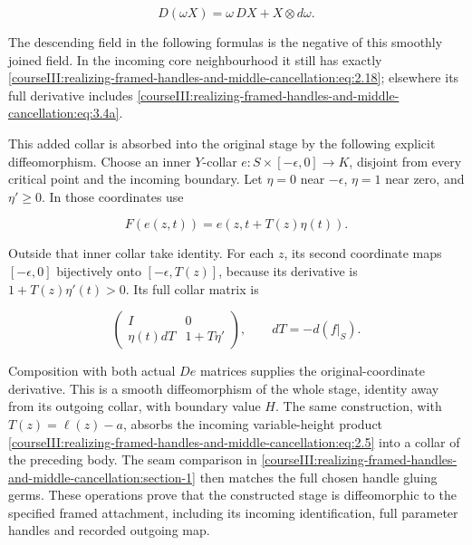 \begin{equation}
D(\omega X)=\omega\,DX+X\otimes d\omega.
 \label{courseIII:realizing-framed-handles-and-middle-cancellation:eq:3.4a}
\end{equation}

The descending field in the following formulas is the negative of this smoothly joined field. In the incoming core neighbourhood it still has exactly \eqref{courseIII:realizing-framed-handles-and-middle-cancellation:eq:2.18}; elsewhere its full derivative includes \eqref{courseIII:realizing-framed-handles-and-middle-cancellation:eq:3.4a}.

This added collar is absorbed into the original stage by the following explicit diffeomorphism. Choose an inner \(Y\)-collar \(e:S\times[-\epsilon,0]\to K\), disjoint from every critical point and the incoming boundary. Let \(\eta=0\) near \(-\epsilon\), \(\eta=1\) near zero, and \(\eta'\geq0\). In those coordinates use

\begin{equation}
F(e(z,t))=e(z,t+T(z)\eta(t)).
 \label{courseIII:realizing-framed-handles-and-middle-cancellation:eq:3.5}
\end{equation}

Outside that inner collar take identity. For each \(z\), its second coordinate maps \([-\epsilon,0]\) bijectively onto \([-\epsilon,T(z)]\), because its derivative is \(1+T(z)\eta'(t)>0\). Its full collar matrix is

\begin{equation}
\begin{pmatrix}
 I&0\\
 \eta(t)dT&1+T\eta'
 \end{pmatrix},
 \qquad dT=-d(f|_S).
 \label{courseIII:realizing-framed-handles-and-middle-cancellation:eq:3.6}
\end{equation}

Composition with both actual \(De\) matrices supplies the original-coordinate derivative. This is a smooth diffeomorphism of the whole stage, identity away from its outgoing collar, with boundary value \(H\). The same construction, with \(T(z)=\ell(z)-a\), absorbs the incoming variable-height product \eqref{courseIII:realizing-framed-handles-and-middle-cancellation:eq:2.5} into a collar of the preceding body. The seam comparison in \cref{courseIII:realizing-framed-handles-and-middle-cancellation:section-1} then matches the full chosen handle gluing germs. These operations prove that the constructed stage is diffeomorphic to the specified framed attachment, including its incoming identification, full parameter handles and recorded outgoing map.


